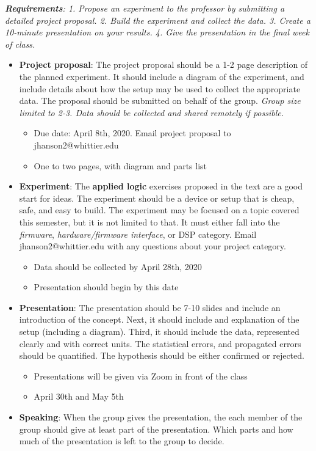 \documentclass[10pt]{article}
\begin{document}
\maketitle

\noindent
\textit{\textbf{Requirements}: 1. Propose an experiment to the professor by submitting a detailed project proposal.  2. Build the experiment and collect the data.  3. Create a 10-minute presentation on your results.  4. Give the presentation in the final week of class.} \\
\begin{itemize}
\item\textbf{ Project proposal}: The project proposal should be a 1-2 page description of the planned experiment.  It should include a diagram of the experiment, and include details about how the setup may be used to collect the appropriate data.  The proposal should be submitted on behalf of the group.  \textit{Group size limited to 2-3.  Data should be collected and shared remotely if possible.}
\begin{itemize}
\item Due date: April 8th, 2020.  Email project proposal to jhanson2@whittier.edu
\item One to two pages, with diagram and parts list
\end{itemize}
\item \textbf{Experiment}: The \textbf{applied logic} exercises proposed in the text are a good start for ideas.  The experiment should be a device or setup that is cheap, safe, and easy to build.  The experiment may be focused on a topic covered this semester, but it is not limited to that. It must either fall into the \textit{firmware}, \textit{hardware/firmware interface}, or DSP category.  Email jhanson2@whittier.edu with any questions about your project category.
\begin{itemize}
\item Data should be collected by April 28th, 2020
\item Presentation should begin by this date
\end{itemize}
\item \textbf{Presentation}: The presentation should be 7-10 slides and include an introduction of the concept.  Next, it should include and explanation of the setup (including a diagram).  Third, it should include the data, represented clearly and with correct units.  The statistical errors, and propagated errors should be quantified.  The hypothesis should be either confirmed or rejected.
\begin{itemize}
\item Presentations will be given via Zoom in front of the class
\item April 30th and May 5th
\end{itemize}
\item \textbf{Speaking}: When the group gives the presentation, the each member of the group should give at least part of the presentation.  Which parts and how much of the presentation is left to the group to decide.
\end{itemize}
\end{document}

